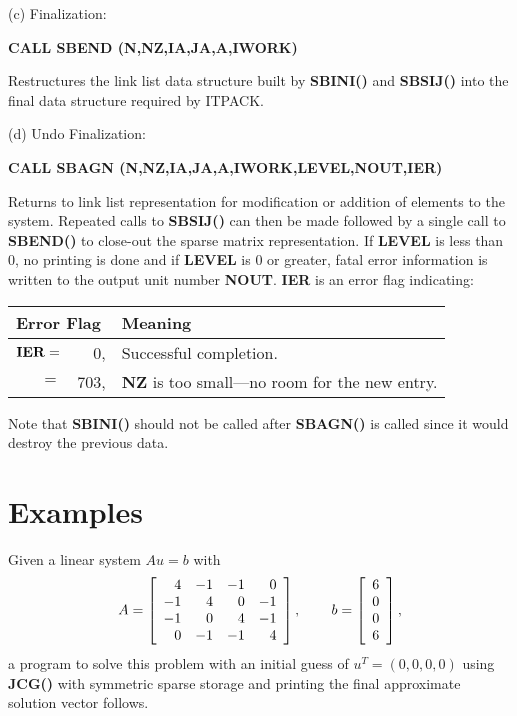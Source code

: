  (c) Finalization:
 
\bigskip
\centerline{\bf CALL SBEND (N,NZ,IA,JA,A,IWORK)}
\bigskip
 
\noindent 
Restructures the link list data structure built by {\bf SBINI()} and 
{\bf SBSIJ()} into the final data structure required by ITPACK.
 
\bigskip
 (d) Undo Finalization:
 
\bigskip
\centerline{\bf CALL SBAGN (N,NZ,IA,JA,A,IWORK,LEVEL,NOUT,IER)}
\bigskip
 
\noindent
Returns to link list representation for modification or addition of
elements to the system.  Repeated calls to {\bf SBSIJ()} can then be made
followed by a single call to {\bf SBEND()} to close-out the sparse matrix
representation.  If {\bf LEVEL} is less than $0$, no printing is done and 
if {\bf LEVEL} is $0$ or greater, fatal error information is written to 
the output unit number {\bf NOUT}.  {\bf IER} is an error flag indicating:
 
\bigskip
\begin{tabular}{rrl} \hline
  \multicolumn{2}{l}{Error Flag} & Meaning \\ \hline
   ${\bf IER} =$ & $0$, & Successful completion. \\
   $ =$ & $703$, & {\bf NZ} is too small---no room for the new entry. \\ \hline
\end{tabular} 
\bigskip
 
\noindent
Note that {\bf SBINI()} should not be called after {\bf SBAGN()} is 
called since it would destroy the previous data.
 
\section{Examples}
\label{examples}
 
   Given a linear system $Au=b$ with
\[ A = \left[ \begin{array}{rrrr}
      4 & -1 & -1 &  0 \\
     -1 &  4 &  0 & -1 \\
     -1 &  0 &  4 & -1 \\
      0 & -1 & -1 &  4 
   \end{array} \right], \hspace{0.3in} b = \left[ \begin{array}{c} 
        6 \\ 0 \\ 0 \\ 6 \end{array} \right], \]
a program to solve this problem with an initial guess of 
$u^T = (0, 0, 0, 0)$ using {\bf JCG()} with symmetric sparse storage and 
printing the final approximate solution vector follows.
 
